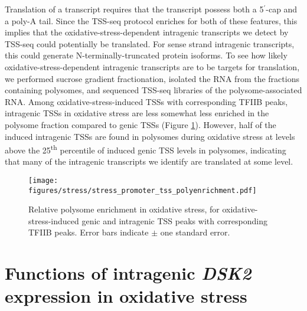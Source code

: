 Translation of a transcript requires that the transcript possess both a 5$^\prime$-cap and a poly-A tail.
Since the TSS-seq protocol enriches for both of these features, this implies that the oxidative-stress-dependent intragenic transcripts we detect by TSS-seq could potentially be translated.
For sense strand intragenic transcripts, this could generate N-terminally-truncated protein isoforms.
To see how likely oxidative-stress-dependent intragenic transcripts are to be targets for translation, we performed sucrose gradient fractionation, isolated the RNA from the fractions containing polysomes, and sequenced TSS-seq libraries of the polysome-associated RNA.
Among oxidative-stress-induced TSSs with corresponding TFIIB peaks, intragenic TSSs in oxidative stress are less somewhat less enriched in the polysome fraction compared to genic TSSs (Figure \ref{fig:stress_promoter_tss_polyenrichment}).
However, half of the induced intragenic TSSs are found in polysomes during oxidative stress at levels above the 25\textsuperscript{th} percentile of induced genic TSS levels in polysomes, indicating that many of the intragenic transcripts we identify are translated at some level.

\begin{figure}[h]
    \texttt{[image: figures/stress/stress\_promoter\_tss\_polyenrichment.pdf]}
    \caption[Relative polysome enrichment in oxidative stress, for oxidative-stress-induced genic and intragenic promoters.]{Relative polysome enrichment in oxidative stress, for oxidative-stress-induced genic and intragenic TSS peaks with corresponding TFIIB peaks. Error bars indicate $\pm$ one standard error.}
    \label{fig:stress_promoter_tss_polyenrichment}
\end{figure}

\section{Functions of intragenic \textit{DSK2} expression in oxidative stress}

